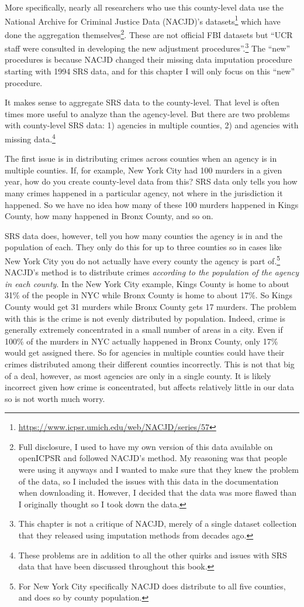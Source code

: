 \documentclass[
]{krantz}
\renewcommand{\href}[2]{#2\footnote{\url{#1}}}
\begin{document}
More specifically, nearly all researchers who use this
county-level data use the National Archive for Criminal
Justice Data (NACJD)'s
\href{https://www.icpsr.umich.edu/web/NACJD/series/57}{datasets}
which have done the aggregation themselves\footnote{Full
  disclosure, I used to have my own version of this data
  available on openICPSR and followed NACJD's method. My
  reasoning was that people were using it anyways and I
  wanted to make sure that they knew the problem of the
  data, so I included the issues with this data in the
  documentation when downloading it. However, I decided that
  the data was more flawed than I originally thought so I
  took down the data.}. These are not official FBI datasets
but ``UCR staff were consulted in developing the new
adjustment procedures''.\footnote{This chapter is not a
  critique of NACJD, merely of a single dataset collection
  that they released using imputation methods from decades
  ago.} The ``new'' procedures is because NACJD changed
their missing data imputation procedure starting with 1994
SRS data, and for this chapter I will only focus on this
``new'' procedure.

It makes sense to aggregate SRS data to the county-level.
That level is often times more useful to analyze than the
agency-level. But there are two problems with county-level
SRS data: 1) agencies in multiple counties, 2) and agencies
with missing data.\footnote{These problems are in addition
  to all the other quirks and issues with SRS data that have
  been discussed throughout this book.}

The first issue is in distributing crimes across counties
when an agency is in multiple counties. If, for example, New
York City had 100 murders in a given year, how do you create
county-level data from this? SRS data only tells you how
many crimes happened in a particular agency, not where in
the jurisdiction it happened. So we have no idea how many of
these 100 murders happened in Kings County, how many
happened in Bronx County, and so on.

SRS data does, however, tell you how many counties the
agency is in and the population of each. They only do this
for up to three counties so in cases like New York City you
do not actually have every county the agency is part
of.\footnote{For New York City specifically NACJD does
  distribute to all five counties, and does so by county
  population.} NACJD's method is to distribute crimes
\emph{according to the population of the agency in each
county}. In the New York City example, Kings County is home
to about 31\% of the people in NYC while Bronx County is
home to about 17\%. So Kings County would get 31 murders
while Bronx County gets 17 murders. The problem with this is
the crime is not evenly distributed by population. Indeed,
crime is generally extremely concentrated in a small number
of areas in a city. Even if 100\% of the murders in NYC
actually happened in Bronx County, only 17\% would get
assigned there. So for agencies in multiple counties could
have their crimes distributed among their different counties
incorrectly. This is not that big of a deal, however, as
most agencies are only in a single county. It is likely
incorrect given how crime is concentrated, but affects
relatively little in our data so is not worth much worry.
\end{document}
